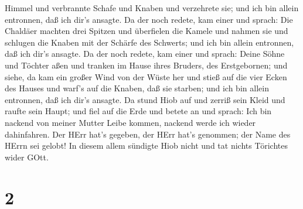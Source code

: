 Himmel und verbrannte Schafe und Knaben und verzehrete sie; und ich bin
allein entronnen, daß ich dir's ansagte.  Da der noch
redete, kam einer und sprach: Die Chaldäer machten drei Spitzen und
überfielen die Kamele und nahmen sie und schlugen die Knaben mit der
Schärfe des Schwerts; und ich bin allein entronnen, daß ich dir's
ansagte.  Da der noch redete, kam einer und sprach: Deine
Söhne und Töchter aßen und tranken im Hause ihres Bruders, des
Erstgebornen;  und siehe, da kam ein großer Wind von der
Wüste her und stieß auf die vier Ecken des Hauses und warf's auf die
Knaben, daß sie starben; und ich bin allein entronnen, daß ich dir's
ansagte.  Da stund Hiob auf und zerriß sein Kleid und
raufte sein Haupt; und fiel auf die Erde und betete an  und
sprach: Ich bin nackend von meiner Mutter Leibe kommen, nackend werde
ich wieder dahinfahren. Der HErr hat's gegeben, der HErr hat's genommen;
der Name des HErrn sei gelobt!  In diesem allem sündigte
Hiob nicht und tat nichts Törichtes wider GOtt.

\hypertarget{section-1}{%
\section{2}\label{section-1}}

